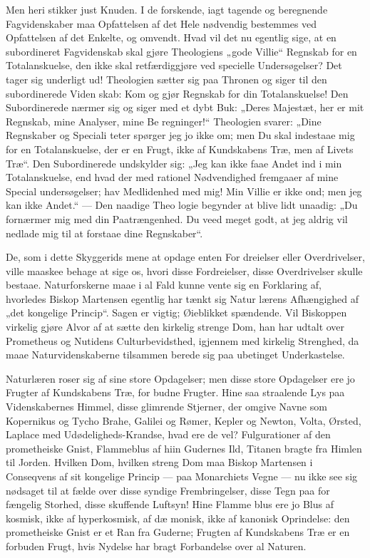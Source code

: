 \documentclass[12pt]{book}
\newcommand{\opage}[1]{\marginnote{\footnotesize\textit{[#1]}}}
\begin{document}
Men heri stikker just Knuden. I de forskende, iagt\-%
tagende og beregnende Fagvidenskaber maa Opfattelsen af det
Hele nødvendig bestemmes ved Opfattelsen af det Enkelte, og
omvendt. Hvad vil det nu egentlig sige, at en subordineret
Fagvidenskab skal gjøre Theologiens „gode Villie“ Regnskab
for en Totalanskuelse, den ikke skal retfærdiggjøre ved specielle
Undersøgelser? Det tager sig underligt ud! Theologien
sætter sig paa Thronen og siger til den subordinerede Viden\-%
skab: Kom og gjør Regnskab for din Totalanskuelse! Den
Subordinerede nærmer sig og siger med et dybt Buk: „Deres
Majestæt, her er mit Regnskab, mine Analyser, mine Be\-%
regninger!“ Theologien svarer: „Dine Regnskaber og Speciali\-%
teter spørger jeg jo ikke om; men Du skal indestaae mig for en
Totalanskuelse, der er en Frugt, ikke af Kundskabens Træ,
men af Livets Træ“. Den Subordinerede undskylder sig:
„Jeg kan ikke faae Andet ind i min Totalanskuelse, end hvad
der med rationel Nødvendighed fremgaaer af mine Special\-%
undersøgelser; hav Medlidenhed med mig! Min Villie er
ikke ond; men jeg kan ikke Andet.“ --- Den naadige Theo\-%
logie begynder at blive lidt unaadig: „Du fornærmer mig
med din Paatrængenhed. Du veed meget godt, at jeg aldrig
vil nedlade mig til at forstaae dine Regnskaber“.

De, som i dette Skyggerids mene at opdage enten For\-%
dreielser eller Overdrivelser, ville maaskee behage at sige os,
hvori disse Fordreielser, disse Overdrivelser skulle bestaae.
Naturforskerne maae i al Fald kunne vente sig en Forklaring af,
hvorledes Biskop Martensen egentlig har tænkt sig Natur\-%
lærens Afhængighed af „det kongelige Princip“. Sagen er
vigtig; Øieblikket spændende. Vil Biskoppen virkelig gjøre
\opage{14}\setcounter{footnote}{0}%
Alvor af at sætte den kirkelig strenge Dom, han har udtalt
over Prometheus og Nutidens Culturbevidsthed, igjennem med
kirkelig Strenghed, da maae Naturvidenskaberne tilsammen
berede sig paa ubetinget Underkastelse.

Naturlæren roser sig af sine store Opdagelser; men disse
store Opdagelser ere jo Frugter af Kundskabens Træ, for\-%
budne Frugter. Hine saa straalende Lys paa Videnskabernes
Himmel, disse glimrende Stjerner, der omgive Navne som
Kopernikus og Tycho Brahe, Galilei og Rømer, Kepler og
Newton, Volta, Ørsted, Laplace med Udødeligheds-Krandse,
hvad ere de vel? Fulgurationer af den prometheiske Gnist,
Flammeblus af hiin Gudernes Ild, Titanen bragte fra
Himlen til Jorden. Hvilken Dom, hvilken streng Dom maa
Biskop Martensen i Conseqvens af sit kongelige Princip ---
paa Monarchiets Vegne --- nu ikke see sig nødsaget til at
fælde over disse syndige Frembringelser, disse Tegn paa for\-%
fængelig Storhed, disse skuffende Luftsyn! Hine Flamme\-%
blus ere jo Blus af kosmisk, ikke af hyperkosmisk, af dæ\-%
monisk, ikke af kanonisk Oprindelse: den prometheiske Gnist
er et Ran fra Guderne; Frugten af Kundskabens Træ er en
forbuden Frugt, hvis Nydelse har bragt Forbandelse over al
Naturen.
\end{document}
